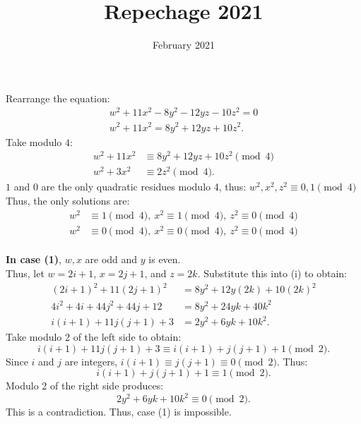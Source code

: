 \documentclass{article}
\title{Repechage 2021}
\date{February 2021}
\begin{document}
Rearrange the equation:
\begin{align*}
    w^2 + 11x^2 -8y^2 -12yz - 10z^2 = 0 \\
    w^2 + 11x^2 = 8y^2 + 12yz + 10z^2. \tag{i}
\end{align*}
Take modulo $4$:
\begin{align*}
    w^2 + 11x^2 &\equiv 8y^2 + 12yz + 10z^2 \pmod 4\\
    w^2 + 3x^2 &\equiv 2z^2 \pmod 4.
\end{align*}
$1$ and $0$ are the only quadratic residues modulo 4, thus: $w^2, x^2, z^2 \equiv 0,1 \pmod 4$ \\
Thus, the only solutions are:
\begin{align}
    w^2 &\equiv 1 \pmod 4,\ x^2 \equiv 1 \pmod 4,\ z^2 \equiv 0 \pmod 4 \\
    w^2 &\equiv 0 \pmod 4,\ x^2 \equiv 0 \pmod 4,\ z^2 \equiv 0 \pmod 4
\end{align}
\\
\textbf{In case (1)}, $w,x$ are odd and $y$ is even. \\
Thus, let $w = 2i + 1$, $x = 2j + 1$, and $z = 2k$. Substitute this into (i) to obtain:
\begin{align*}
    (2i + 1)^2 + 11(2j + 1)^2 &= 8y^2 + 12y(2k) + 10(2k)^2 \\
    4i^2 + 4i + 44j^2 + 44j + 12 &= 8y^2 + 24yk + 40k^2 \\
    i(i + 1) + 11j(j+1) + 3 &= 2y^2 + 6yk + 10k^2.
\end{align*}
Take modulo 2 of the left side to obtain:
$$i(i + 1) + 11j(j+1) + 3 \equiv i(i + 1) + j(j+1) + 1 \pmod 2.$$
Since $i$ and $j$ are integers, $i(i + 1) \equiv j(j+1) \equiv 0 \pmod 2$. Thus:
$$i(i + 1) + j(j+1) + 1 \equiv 1 \pmod 2.$$
Modulo 2 of the right side produces:
$$2y^2 + 6yk + 10k^2 \equiv 0 \pmod 2.$$
This is a contradiction. Thus, case (1) is impossible. \\ \\
\end{document}
